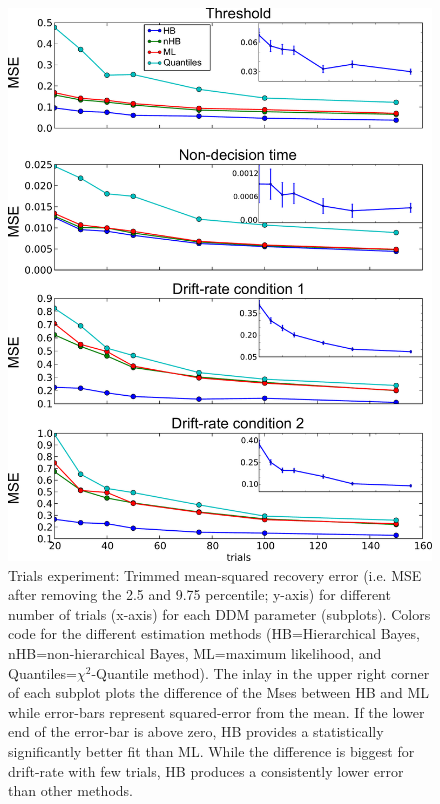 \documentclass[letterpaper,10pt,english]{article}
\begin{document}
\begin{figure}
\includegraphics[width=.7\columnwidth]{trials_exp_single_mean_inlay.pdf}
\caption{Trials experiment: Trimmed mean-squared recovery error (i.e.
MSE after removing the 2.5 and 9.75 percentile; y-axis) for different
number of trials (x-axis) for each DDM parameter (subplots). Colors
code for the different estimation methods (HB=Hierarchical Bayes,
nHB=non-hierarchical Bayes, ML=maximum likelihood, and
Quantiles=$\chi^2$-Quantile method). The inlay in the upper right
corner of each subplot plots the difference of the Mses between HB and
ML while error-bars represent squared-error from the mean. If the
lower end of the error-bar is above zero, HB provides a statistically
significantly better fit than ML. While the difference is biggest for
drift-rate with few trials, HB produces a consistently lower error
than other methods.}
\label{fig.trials}
\end{figure}
\end{document}
